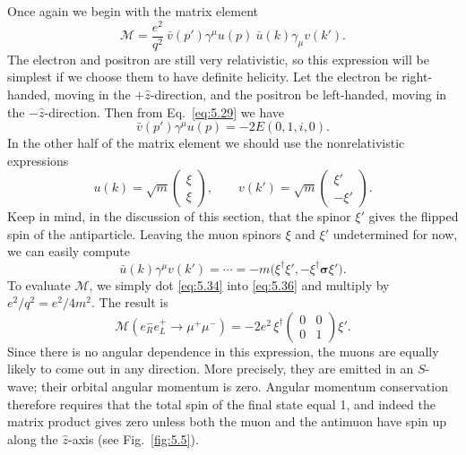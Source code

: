 Once again we begin with the matrix element
\begin{equation}
  \mathcal{M} = \frac{e^2}{q^2}\ \bar{v}(p')\gamma^\mu u(p)\
    \bar{u}(k)\gamma_\mu v(k') .
\end{equation}
The electron and positron are still very relativistic, so this expression will
be simplest if we choose them to have definite helicity.  Let the electron be
right-handed, moving in the $+\hat{z}$-direction, and the positron be
left-handed, moving in the $-\hat{z}$-direction.  Then from Eq.~\eqref{eq:5.29}
we have
\begin{equation}
  \bar{v}(p')\gamma^\mu u(p) = -2E(0, 1, i, 0) .
  \label{eq:5.34}
\end{equation}
In the other half of the matrix element we should use the nonrelativistic
expressions
\begin{equation}
  u(k) = \sqrt{m}\begin{pmatrix}\xi\\ \xi\end{pmatrix},\qquad
  v(k') = \sqrt{m}\begin{pmatrix}\xi'\\ -\xi'\end{pmatrix} .
  \label{eq:5.35}
\end{equation}
Keep in mind, in the discussion of this section, that the spinor $\xi'$ gives
the flipped spin of the antiparticle.  Leaving the muon spinors $\xi$ and
$\xi'$ undetermined for now, we can easily compute
\begin{equation}
  \bar{u}(k)\gamma^\mu v(k') = \cdots = -m\bigl( \xi^{\dagger}\xi',
    -\xi^{\dagger}\bm{\sigma}\xi' \bigr) .
  \label{eq:5.36}
\end{equation}
To evaluate $\mathcal{M}$, we simply dot \eqref{eq:5.34} into \eqref{eq:5.36}
and multiply by $e^2/q^2 = e^2/4m^2$.  The result is
\begin{equation}
  \mathcal{M}(e^{-}_R e^{+}_L \to \mu^{+}\mu^{-})
    = -2e^2\,\xi^{\dagger}\begin{pmatrix}0&0\\0&1\end{pmatrix}\xi' .
  \label{eq:5.37}
\end{equation}
Since there is no angular dependence in this expression, the muons are equally
likely to come out in any direction.  More precisely, they are emitted in an
$S$-wave; their orbital angular momentum is zero.  Angular momentum
conservation therefore requires that the total spin of the final state equal
1, and indeed the matrix product gives zero unless both the muon and the
antimuon have spin up along the $\hat{z}$-axis (see Fig.~\ref{fig:5.5}).

